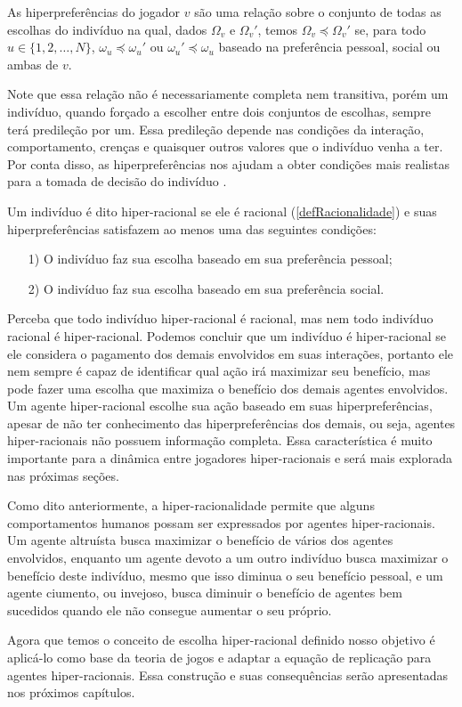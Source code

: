 \begin{definition}
    \label{defHiperPreferencias}
    As hiperpreferências do jogador $v$ são uma relação sobre o conjunto de todas as escolhas do indivíduo na qual, dados $\Omega_v$ e $\Omega_v'$, temos $\Omega_v\preceq\Omega_v'$ se, para todo $u\in\{1,2,\dots,N\}$, $\omega_u\preceq\omega_u'$ ou $\omega_u'\preceq\omega_u$ baseado na preferência pessoal, social ou ambas de $v$.
\end{definition}

Note que essa relação não é necessariamente completa nem transitiva, porém um indivíduo, quando forçado a escolher entre dois conjuntos de escolhas, sempre terá predileção por um. Essa predileção depende nas condições da interação, comportamento, crenças e quaisquer outros valores que o indivíduo venha a ter. Por conta disso, as hiperpreferências nos ajudam a obter condições mais realistas para a tomada de decisão do indivíduo \cite{askari2019behavioral}.

\begin{definition}
    Um indivíduo é dito hiper-racional se ele é racional (\ref{defRacionalidade}) e suas hiperpreferências satisfazem ao menos uma das seguintes condições:
    \begin{itemize}
        \item [1)] O indivíduo faz sua escolha baseado em sua preferência pessoal;
        \item [2)] O indivíduo faz sua escolha baseado em sua preferência social.
    \end{itemize}
\end{definition}

Perceba que todo indivíduo hiper-racional é racional, mas nem todo indivíduo racional é hiper-racional. Podemos concluir que um indivíduo é hiper-racional se ele considera o pagamento dos demais envolvidos em suas interações, portanto ele nem sempre é capaz de identificar qual ação irá maximizar seu benefício, mas pode fazer uma escolha que maximiza o benefício dos demais agentes envolvidos. Um agente hiper-racional escolhe sua ação baseado em suas hiperpreferências, apesar de não ter conhecimento das hiperpreferências dos demais, ou seja, agentes hiper-racionais não possuem informação completa. Essa característica é muito importante para a dinâmica entre jogadores hiper-racionais e será mais explorada nas próximas seções.

Como dito anteriormente, a hiper-racionalidade permite que alguns comportamentos humanos possam ser expressados por agentes hiper-racionais. Um agente altruísta busca maximizar o benefício de vários dos agentes envolvidos, enquanto um agente devoto a um outro indivíduo busca maximizar o benefício deste indivíduo, mesmo que isso diminua o seu benefício pessoal, e um agente ciumento, ou invejoso, busca diminuir o benefício de agentes bem sucedidos quando ele não consegue aumentar o seu próprio.

Agora que temos o conceito de escolha hiper-racional definido nosso objetivo é aplicá-lo como base da teoria de jogos e adaptar a equação de replicação para agentes hiper-racionais. Essa construção e suas consequências serão apresentadas nos próximos capítulos.
